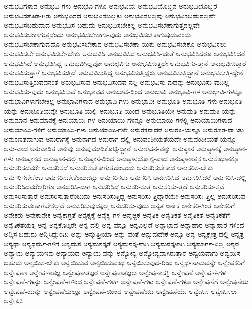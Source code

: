{ಅನುಭವಿಗಳಾದ
ಅನುಭವಿ-ಗಳು
ಅನುಭವಿ-ಗಳೂ
ಅನುಭವಿಯ
ಅನುಭವಿಯೊಬ್ಬನ
ಅನುಭವಿಯೊಬ್ಬರ
ಅನುಭವಿಸತೊಡ-ಗಿತು
ಅನುಭವಿಸದ
ಅನುಭವಿಸಬಲ್ಲಳು
ಅನುಭವಿಸಬಲ್ಲವು
ಅನುಭವಿಸಬಹುದಲ್ಲವೇ
ಅನುಭವಿಸಬಹುದಾದ
ಅನುಭವಿಸ-ಬಹುದು
ಅನುಭವಿಸಬೇಕಲ್ಲ
ಅನುಭವಿಸಬೇಕಾಗುತ್ತದಲ್ಲವೇ
ಅನುಭವಿಸಬೇಕಾಗುತ್ತದೆಂದು
ಅನುಭವಿಸಬೇಕಾಗು-ವುದು
ಅನುಭವಿಸಬೇಕಾಗುವುದುಎಂದು
ಅನುಭವಿಸಬೇಕಾಗುವುದೊ
ಅನುಭವಿಸಬೇಕಾದ
ಅನುಭವಿಸಬೇಕಾ-ಯಿತು
ಅನುಭವಿಸಬೇಕೊ
ಅನುಭವಿಸಲು
ಅನುಭವಿಸಲೇ
ಅನುಭವಿಸಲೇ-ಬೇಕು
ಅನುಭವಿಸಿ
ಅನುಭವಿಸಿದ
ಅನುಭವಿಸಿ-ದಂತೆ
ಅನುಭವಿಸಿದರೂ
ಅನುಭವಿಸಿದರೆ
ಅನುಭವಿಸಿದೆ
ಅನುಭವಿಸಿದ್ದ
ಅನುಭವಿಸಿಲ್ಲವೋ
ಅನುಭವಿಸು
ಅನುಭವಿಸುತ್ತಲೇ
ಅನುಭವಿಸು-ತ್ತಾನೆ
ಅನುಭವಿಸುತ್ತಾರೆ
ಅನುಭವಿಸುತ್ತಾಳೆ
ಅನುಭವಿಸುತ್ತಿದೆ
ಅನುಭವಿಸುತ್ತಿದ್ದ
ಅನುಭವಿಸುತ್ತಿದ್ದರು
ಅನುಭವಿಸುತ್ತಿದ್ದಾನೆ
ಅನುಭವಿಸುತ್ತಿ-ದ್ದೇನೆ
ಅನುಭವಿಸುತ್ತಿರುವವನಂತೆ
ಅನುಭವಿಸುವ
ಅನುಭವಿಸುವವ-ನಲ್ಲಿ
ಅನುಭವಿಸು-ವುದನ್ನು
ಅನುಭವಿಸು-ವುದಿಲ್ಲ
ಅನುಭವಿಸು-ವುದು
ಅನುಭವಿಸುವೆ
ಅನುಭಾವದ
ಅನುಭಾವ-ದಿಂದ
ಅನುಭಾವಿ
ಅನುಭಾವಿ-ಗಳ
ಅನುಭಾವಿ-ಗಳನ್ನೂ
ಅನುಭಾವಿಗಳಾಗಬೇಕಿಲ್ಲ
ಅನುಭಾವಿಗಳಾದ
ಅನುಭಾವಿ-ಗಳು
ಅನುಭಾವೀ
ಅನುಭೂತಿ
ಅನುಭೂತಿ-ಗಳು
ಅನುಭೂತಿ-ಯನ್ನು
ಅನುಭೂತಿಯನ್ನೇ
ಅನುಭೂತಿ-ಯಲ್ಲಿ
ಅನುಭೂತಿ-ಯಿಂದ
ಅನುಭೂತಿಯೇ
ಅನುಮತಿ
ಅನುಮತಿ-ಯನ್ನು
ಅನುಮಾನ
ಅನುಮಾನಕ್ಕೆ
ಅನುಯಾಯಿ-ಗಳ
ಅನುಯಾಯಿ-ಗಳನ್ನೂ
ಅನುಯಾಯಿ-ಗಳಲ್ಲಿ
ಅನುಯಾಯಿಗಳಾದ
ಅನುಯಾಯಿ-ಗಳಿಗೆ
ಅನುಯಾಯಿ-ಗಳು
ಅನುಯಾಯಿ-ಗಳೇ
ಅನುರಕ್ತರಾದರೆ
ಅನುರಕ್ತಿ-ಯನ್ನೂ
ಅನುರಣಿತ-ವಾಗಿತ್ತು
ಅನುರಣಿತವಾಗುವ
ಅನುರಾಗಕ್ಕೆ
ಅನುರಾಗದ
ಅನುರಾಗ-ದಲ್ಲಿ
ಅನುವಂಶೀಯತೆಯದೇ
ಅನುವಂಶೀಯತೆ-ಯನ್ನೂ
ಅನು-ವಾದ
ಅನುವಾದಿತ
ಅನುವು
ಅನುವುಮಾಡಿಕೊಟ್ಟಿ-ದ್ದಾರೆ
ಅನುಶಾಸನ-ವನ್ನು
ಅನುಷ್ಠಾನ
ಅನುಷ್ಠಾನಕ್ಕೆ
ಅನುಷ್ಠಾನ-ಗಳು
ಅನುಷ್ಠಾನದ
ಅನುಷ್ಠಾನ-ದಲ್ಲಿ
ಅನುಷ್ಠಾನ-ದಿಂದ
ಅನುಷ್ಠಾನಯೋಗ್ಯ-ವಾದ
ಅನುಷ್ಠಾನಾತ್ಮಕ
ಅನುಸಂಧಾನಕ್ಕೂ
ಅನುಸರಿಸದವರೇ
ಅನುಸರಿಸದೆ
ಅನುಸರಿಸಬೇಕಾಗುತ್ತದೆಂಬುದು
ಅನುಸರಿಸಬೇಕಾದ
ಅನುಸರಿಸ-ಬೇಕು
ಅನುಸರಿಸಬೇಕೆಂಬ
ಅನುಸರಿಸಬೇಕೆಂಬುದನ್ನು
ಅನುಸರಿಸಲು
ಅನುಸರಿಸಿ
ಅನುಸರಿಸಿದ
ಅನುಸರಿಸಿದರೆ
ಅನುಸರಿಸಿ-ದಲ್ಲಿ
ಅನುಸರಿಸಿದವರೆಲ್ಲರಿಗೂ
ಅನುಸರಿಸಿ-ದಾಗ
ಅನುಸರಿಸಿದೆ
ಅನುಸರಿ-ಸುತ್ತ
ಅನುಸರಿಸು-ತ್ತದೆ
ಅನುಸರಿಸು-ತ್ತವೆ
ಅನುಸರಿಸುತ್ತಾರೆ
ಅನುಸರಿಸುತ್ತಾರೆಂಬುದು
ಅನುಸರಿಸುತ್ತಿದ್ದ
ಅನುಸರಿಸು-ತ್ತಿದ್ದಾರೆಯೇ
ಅನುಸರಿಸು-ತ್ತಿಲ್ಲ
ಅನುಸರಿಸುವ
ಅನುಸರಿಸುವಂತಾಗಬೇಕಲ್ಲವೆ
ಅನುಸರಿಸುವುದಕ್ಕಲ್ಲ
ಅನುಸರಿಸು-ವುದು
ಅನೃತ
ಅನೇಕ
ಅನೇಕರಿ-ಗಿಂತ
ಅನೇಕರಿಗೆ
ಅನೇಕರು
ಅನೇಕಾನೇಕ
ಅನೈಕಾಗ್ರತೆ
ಅನೈಕ್ಯಕ್ಕೆ
ಅನೈಕ್ಯ-ಗಳ
ಅನೈಚ್ಛಿಕ
ಅನೈತಿಕ
ಅನೈತಿಕತ
ಅನೈತಿಕತೆ
ಅನೈತಿಕತೆಗೆ
ಅನೈತಿಕತೆಯತ್ತ
ಅನ್ನ
ಅನ್ನಕೊಟ್ಟರೇ
ಅನ್ನ-ದಲ್ಲಿ
ಅನ್ನ-ವನ್ನೂ
ಅನ್ನವಿಲ್ಲದೆ
ಅನ್ನಾಭಾವ
ಅನ್ನಾಹಾರ
ಅನ್ನಾಹಾರ-ಗಳಿಂದ
ಅನ್ನಿಸ-ಬಹುದು
ಅನ್ನಿಸಿದ್ದುಂಟು
ಅನ್ನು
ಅನ್ನುತ್ತೀಯಾ
ಅನ್ನು-ವಂತೆ
ಅನ್ನುವುದೇಕೆ
ಅನ್ನೂ
ಅನ್ಯ
ಅನ್ಯಕ್ಷೇತ್ರ-ದಲ್ಲಿ
ಅನ್ಯತ್ರ
ಅನ್ಯಥಾ
ಅನ್ಯಧರ್ಮ-ಗಳಿಗೆ
ಅನ್ಯಮತ
ಅನ್ಯಮನಸ್ಕತೆ
ಅನ್ಯಮನಸ್ಕ-ನಾಗಿ
ಅನ್ಯಮನಸ್ಕಳಾಗಿ
ಅನ್ಯಮಾರ್ಗ-ವಿಲ್ಲ
ಅನ್ಯರ
ಅನ್ಯಾಯ
ಅನ್ಯಾಯಇವು
ಅನ್ಯಾಯದ
ಅನ್ಯಾಯ-ವನ್ನು
ಅನ್ಯೋನ್ಯ
ಅನ್ಯೋನ್ಯವಾಗಿರುತ್ತಾರೆ
ಅನ್ವಯವಾಗು
ಅನ್ವಯಿಸ-ಬಹುದು
ಅನ್ವಯಿಸ-ಬೇಕು
ಅನ್ವಯಿಸುವ
ಅನ್ವಯಿಸುವಂಥ
ಅನ್ವಯಿಸುವುದ-ರಿಂದ
ಅನ್ವರ್ಥನಾಮವನ್ನೇ
ಅನ್ವೇಷಕರಿಗೆ
ಅನ್ವೇಷಣಾ
ಅನ್ವೇಷಣಾತಜ್ಞ
ಅನ್ವೇಷಣಾತಜ್ಞರ
ಅನ್ವೇಷಣಾತಜ್ಞರು
ಅನ್ವೇಷಣಾಸಕ್ತಿ
ಅನ್ವೇಷಣೆ
ಅನ್ವೇಷಣೆ-ಗಳ
ಅನ್ವೇಷಣೆ-ಗಳನ್ನು
ಅನ್ವೇಷಣೆ-ಗಳಿಂದ
ಅನ್ವೇಷಣೆ-ಗಳಿಗೆ
ಅನ್ವೇಷಣೆ-ಗಳು
ಅನ್ವೇಷಣೆ-ಗಳೂ
ಅನ್ವೇಷಣೆಗೆ
ಅನ್ವೇಷಣೆಯ
ಅನ್ವೇಷಣೆ-ಯನ್ನು
ಅನ್ವೇಷಣೆಯಲ್ಲೂ
ಅನ್ವೇಷಣೆ-ಯಿಂದ
ಅನ್ವೇಷಣೆಯು
ಅನ್ವೇಷಣೆಯೇ
ಅನ್ವೇಷಿಸ
ಅನ್ವೇಷಿಸಲು
ಅನ್ವೇಷಿಸಿ
}
